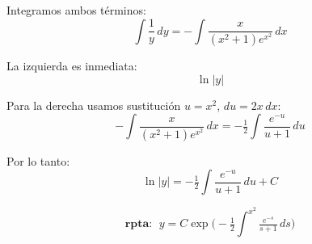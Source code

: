\documentclass[12pt,a4paper]{article}
\begin{document}
\begin{multicols}{2}
Integramos ambos términos:
\[
\int \frac{1}{y}\,dy = -\int \frac{x}{(x^2+1)e^{x^2}}\,dx
\]

La izquierda es inmediata:
\[
\ln|y|
\]

Para la derecha usamos sustitución $u=x^2$, $du=2x\,dx$:
\[
-\int \frac{x}{(x^2+1)e^{x^2}}\,dx
= -\tfrac{1}{2}\int \frac{e^{-u}}{u+1}\,du
\]

Por lo tanto:
\[
\ln|y| = -\tfrac{1}{2}\int \frac{e^{-u}}{u+1}\,du + C
\]

\[
\textbf{rpta: } \; y = C \exp\!\Big(-\tfrac{1}{2}\int^{x^2}\tfrac{e^{-s}}{s+1}\,ds\Big)
\]

\end{multicols}
\end{document}
